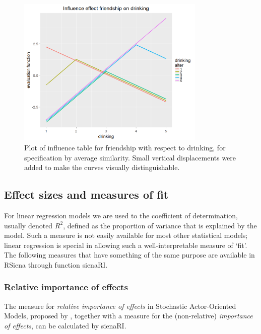 \documentclass[a4paper,fleqn,11pt]{article}
\newcommand{\+}{\, + \,}
\newcommand{\sfn}[1]{\textsf{#1}}
\newcommand{\RS}{{\sf \textsf{RSiena} }}
\newcommand{\saom}{{Stochastic Actor-Oriented Model}}
\begin{document}
\begin{figure}[hb]
  \centering
  \includegraphics[width=0.8\textwidth]{influenceTable_s_drinking.png}
  \caption{Plot of influence table  for friendship with respect to drinking,\protect\newline
  for specification by average similarity.
  \protect\newline Small vertical displacements
  were added to make the curves visually distinguishable.}
  \label{F_infl_dk_avsim}
\end{figure}

\clearpage

\subsection{Effect sizes and measures of fit}

For linear regression models we are used to the coefficient of determination,
usually denoted $R^2$, defined as the proportion of variance
that is explained by the model.
Such a measure is not easily available for most other statistical models;
linear regression is special in allowing such a well-interpretable
measure of `fit'.
The following measures that have something of the same purpose
are available in \RS through function  \sfn{sienaRI}.

\subsubsection{Relative importance of effects}

The measure for \emph{relative importance of effects} in {\saom}s,
proposed by \citet{IndlekoferBrandes2013},
together with a measure for the (non-relative) \emph{importance of effects},
can be calculated by \sfn{sienaRI}.
\end{document}
